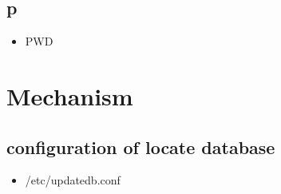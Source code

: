 \documentclass[titlepage]{article}
\begin{document}
      \subsection{p}
        \begin{itemize}
        	\item PWD
        \end{itemize}
    
    \section{Mechanism}
      \subsection{configuration of locate database}
        \begin{itemize}
        	\item /etc/updatedb.conf
        \end{itemize}
\end{document}
